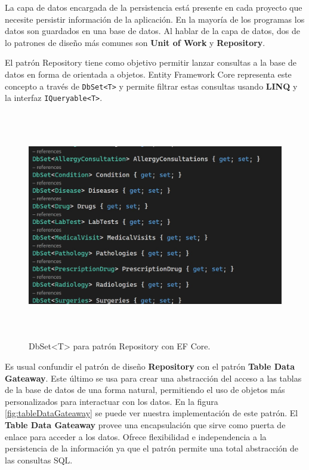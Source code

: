 La capa de datos encargada de la persistencia está presente en cada proyecto que necesite persistir información de la aplicación. En la mayoría de los programas los datos son guardados en una base de datos. Al hablar de la capa de datos, dos de lo patrones de diseño más comunes son \textbf{Unit of Work} y  \textbf{Repository}.
\newline

El patrón Repository tiene como objetivo permitir lanzar consultas a la base de datos en forma de orientada a objetos. Entity Framework Core representa este concepto a través de \lstinline{DbSet<T>}  y permite filtrar estas consultas usando \textbf{LINQ} y la interfaz \lstinline{IQueryable<T>}. 

\begin{figure}[H]
	\centering
	\includegraphics[width = 12cm, height=10cm]{Graphics/ef_core_repository_pattern.jpg}
	\caption{DbSet<T> para patrón Repository con EF Core.}
	\label{fig:EfCoreRepository}
\end{figure}

Es usual confundir el patrón de diseño \textbf{Repository} con el patrón \textbf{Table Data Gateaway}. Este último se usa para crear una abstracción del acceso a las tablas de la base de datos de una forma natural, permitiendo el uso de objetos más personalizados para interactuar con los datos. En la figura \ref{fig:tableDataGateaway} se puede ver nuestra implementación de este patrón. El \textbf{Table Data Gateaway} provee una encapsulación que sirve como puerta de enlace para acceder a los datos. Ofrece flexibilidad e independencia a la persistencia de la información ya que el patrón permite una total abstracción de las consultas SQL.

